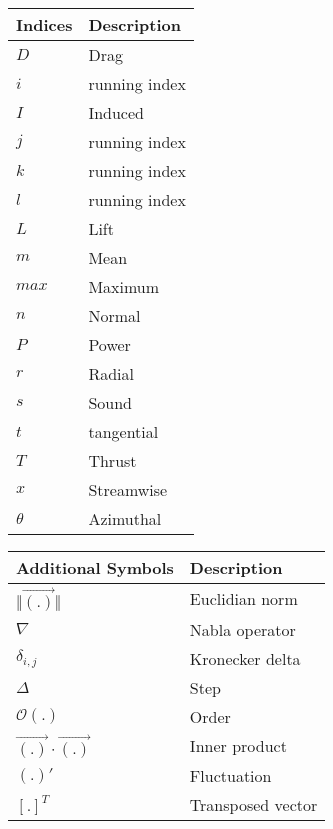 \vspace{0.5cm}
\begin{longtable}{p{7cm}p{7cm}}
	Indices & Description  \\ \hline
	$D$ 	& Drag \\
	$i$		& running index \\
	$I$		& Induced \\
	$j$		& running index \\
	$k$		& running index \\
	$l$		& running index \\
	$L$		& Lift \\
    $m$     & Mean \\
    $max$	& Maximum \\
    $n$		& Normal \\
    $P$		& Power \\
    $r$		& Radial \\
    $s$		& Sound \\
    $t$		& tangential \\
    $T$		& Thrust \\
    $x$		& Streamwise \\
    $\theta$& Azimuthal \\
\end{longtable}

\vspace{0.5cm}

\begin{longtable}{p{7cm}p{7cm}}
	Additional Symbols          & Description    \\ \hline
	$\Vert \vec{(.)} \Vert $    & Euclidian norm \\
	$\nabla$                    & Nabla operator \\
	$\delta_{i,j}$				& Kronecker delta \\
	$\Delta$                    & Step \\
	$\mathcal{O}(.)$			& Order \\
	$\vec{(.)} \cdot \vec{(.)}$ & Inner product \\
	$(.)'$						& Fluctuation \\
	$[.]^T$						& Transposed vector \\	
\end{longtable}

